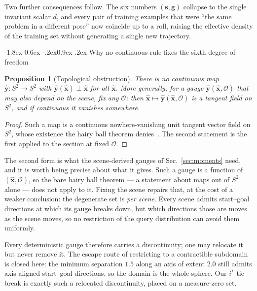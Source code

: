 \documentclass[10pt,twocolumn,letterpaper]{article}
\makeatletter
\renewcommand\subsection{\@startsection{subsection}{2}{\z@}%
  {-1.8ex\@plus -0.6ex \@minus -.2ex}{0.9ex \@plus .2ex}%
  {\normalfont\normalsize\bfseries}}
\theoremstyle{plain}
\newtheorem{proposition}{Proposition}
\newcommand{\xhat}{\hat{\mathbf{x}}}
\newcommand{\yhat}{\hat{\mathbf{y}}}
\newcommand{\svec}{\mathbf{s}}
\newcommand{\gvec}{\mathbf{g}}
\makeatother
\begin{document}
Two further consequences follow. The six numbers $(\svec,\gvec)$ collapse to the
single invariant scalar $d$, and every pair of training examples that were ``the
same problem in a different pose'' now coincide up to a roll, raising the
effective density of the training set without generating a single new trajectory.

\subsection{Why no continuous rule fixes the sixth degree of freedom}
\label{sec:moments}

\begin{proposition}[Topological obstruction]
\label{prop:hairy}
There is no continuous map $\yhat:S^2\to S^2$ with $\yhat(\xhat)\perp\xhat$ for
all $\xhat$. More generally, for a gauge $\yhat(\xhat,\mathcal{O})$ that may also
depend on the scene, fix any $\mathcal{O}$: then $\xhat\mapsto\yhat(\xhat,\mathcal{O})$
is a tangent field on $S^2$, and if continuous it vanishes somewhere.
\end{proposition}

\begin{proof}
Such a map is a continuous nowhere-vanishing unit tangent vector field on $S^2$,
whose existence the hairy ball theorem denies~\cite{milnor1978hairy}. The second
statement is the first applied to the section at fixed $\mathcal{O}$.
\end{proof}

The second form is what the scene-derived gauges of Sec.~\ref{sec:moments} need,
and it is worth being precise about what it gives. Such a gauge is a function of
$(\xhat,\mathcal{O})$, so the bare hairy ball theorem --- a statement about maps
out of $S^2$ alone --- does not apply to it. Fixing the scene repairs that, at
the cost of a weaker conclusion: the degenerate set is \emph{per scene}. Every
scene admits start--goal directions at which its gauge breaks down, but which
directions those are moves as the scene moves, so no restriction of the query
distribution can avoid them uniformly.

Every deterministic gauge therefore carries a discontinuity; one may relocate it
but never remove it. The escape route of restricting to a contractible subdomain
is closed here: the minimum separation $1.5$ along an axis of extent $2.0$ still
admits axis-aligned start--goal directions, so the domain is the whole sphere. Our
$i^\ast$ tie-break is exactly such a relocated discontinuity, placed on a
measure-zero set.
\end{document}
